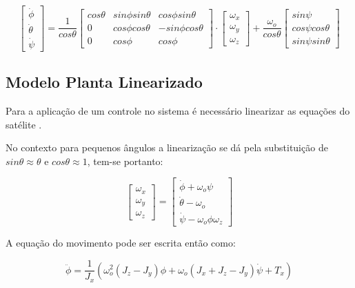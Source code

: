 \begin{equation}
	\begin{bmatrix}
		\dot{\phi}  \\
		\dot{\theta} \\
		\dot{\psi}
\end{bmatrix} = \frac{1}{cos\theta}
\begin{bmatrix}
	cos\theta & sin\phi sin\theta & cos\phi sin\theta \\
	0 & cos\phi cos\theta & -sin\phi cos\theta \\
	0 & cos\phi & cos\phi
\end{bmatrix} \cdot
 \begin{bmatrix}
 	\omega_x\\
 	\omega_y\\
 	\omega_z
 \end{bmatrix} + \frac{\omega_o}{cos\theta}
 \begin{bmatrix}
 	sin\psi  \\
 	cos\psi cos\theta \\
 	sin\psi sin\theta
 \end{bmatrix}
\end{equation}

\subsection{Modelo Planta Linearizado}\label{sec:3.1.3.}

Para a aplicação de um controle no sistema é necessário linearizar as equações do satélite .

No contexto para pequenos ângulos a linearização se dá pela substituição de $sin\theta\approx\theta$ e $cos\theta\approx1$, tem-se portanto:

\begin{equation}
\begin{bmatrix}
	\omega_x \\
	\omega_y \\
	\omega_z
\end{bmatrix}
=
\begin{bmatrix}
	\dot{\phi}+\omega_o\psi \\
	\dot{\theta}-\omega_o \\
	\dot{\psi}-\omega_o\phi \omega_z
\end{bmatrix}  
\end{equation}

A equação do movimento pode ser escrita então como:

\begin{equation}
\ddot{\phi}=\frac{1}{J_x}(\omega_o^2(J_z-J_y)\phi+\omega_o(J_x+J_z-J_y)\dot{\psi}+T_x)
\end{equation}

